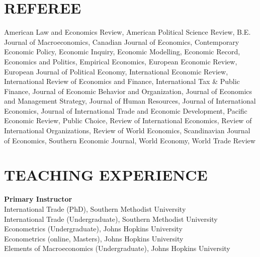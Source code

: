 \documentclass[11pt]{res}
\begin{document}
\begin{resume}
\section{REFEREE} \vspace{1.5mm}
American Law and Economics Review, American Political Science Review, B.E. Journal of Macroeconomics, Canadian Journal of Economics, Contemporary Economic Policy, Economic Inquiry, Economic Modelling, Economic Record, 
Economics and Politics, Empirical Economics, European Economic Review, European Journal of Political Economy, International Economic Review, International Review of Economics and Finance, International Tax \& Public Finance,
Journal of Economic Behavior and Organization, Journal of Economics and Management Strategy, Journal of Human Resources, Journal of International Economics, Journal of International Trade and Economic Development, Pacific Economic Review,
Public Choice, Review of International Economics, Review of International Organizations, Review of World Economics, Scandinavian Journal of Economics, Southern Economic Journal, World Economy, World Trade Review\vspace{4mm}\\

\section{TEACHING EXPERIENCE} \vspace{1.5mm}
{\bf Primary Instructor}\vspace{1.5mm}\\
International Trade (PhD), Southern Methodist University\vspace{1.5mm}\\
International Trade (Undergraduate), Southern Methodist University\vspace{1.5mm}\\
Econometrics (Undergraduate), Johns Hopkins University\vspace{1.5mm}\\
Econometrics (online, Masters), Johns Hopkins University\vspace{1.5mm}\\
Elements of Macroeconomics (Undergraduate), Johns Hopkins University

\end{resume}
\end{document}
